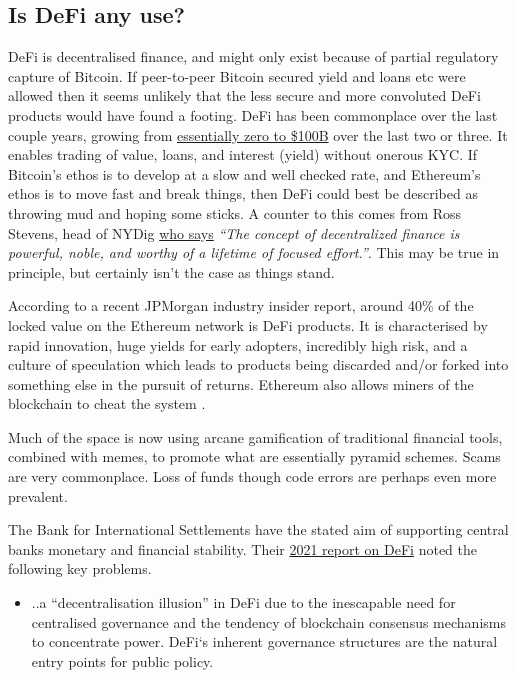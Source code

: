 \begin{itemize}
\section{Is DeFi any use?}
DeFi is decentralised finance, and might only exist because of partial regulatory capture of Bitcoin. If peer-to-peer Bitcoin secured yield and loans etc were allowed then it seems unlikely that the less secure and more convoluted DeFi products would have found a footing. DeFi  has been commonplace over the last couple years, growing from \href{https://a16zcrypto.com/state-of-crypto-report-a16z-2022/}{essentially zero to \$100B} over the last two or three. It enables trading of value, loans, and interest (yield) without onerous KYC. If Bitcoin's ethos is to develop at a slow and well checked rate, and Ethereum's ethos is to move fast and break things, then DeFi could best be described as throwing mud and hoping some sticks. A counter to this comes from Ross Stevens, head of NYDig \href{https://nydig.com/on-impossible-things-before-breakfast}{who says} \textit{``The concept of decentralized finance is powerful, noble, and worthy of a lifetime of focused effort.''}. This may be true in principle, but certainly isn't the case as things stand.\par
According to a recent JPMorgan industry insider report, around 40\% of the locked value on the Ethereum network is DeFi products. It is characterised by rapid innovation, huge yields for early adopters, incredibly high risk, and a culture of speculation which leads to products being discarded and/or forked into something else in the pursuit of returns. Ethereum also allows miners of the blockchain to cheat the system \cite{piet2022extracting}.\par 
Much of the space is now using arcane gamification of traditional financial tools, combined with memes, to promote what are essentially pyramid schemes. Scams are very commonplace. Loss of funds though code errors are perhaps even more prevalent.\par
The Bank for International Settlements have the stated aim of supporting central banks monetary and financial stability. Their \href{https://www.bis.org/publ/qtrpdf/r_qt2112b.pdf}{2021 report on DeFi} noted the following key problems.
\begin{itemize}
\item ..a ``decentralisation illusion'' in DeFi due to the inescapable need for centralised governance and the tendency of blockchain consensus mechanisms to concentrate power. DeFi`s inherent governance structures are the natural entry points for public policy.

\end{itemize}
\end{itemize}
